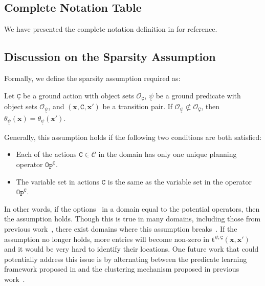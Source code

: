 

\subsection{Complete Notation Table}\label{app:notation}

We have presented the complete notation definition in  for reference.

\subsection{Discussion on the Sparsity Assumption}\label{app:assumption}
Formally, we define the sparsity assumption required as:
\begin{assumption}
    Let $\underline{\mathtt{C}}$ be a ground action with object sets $\mathcal{O}_{\underline{\mathtt{C}}}$, $\underline{\psi}$ be a 
    ground predicate with object sets $\mathcal{O}_{\underline{\psi}}$, and $(\mathbf{x}, \underline{\mathtt{C}}, \mathbf{x}')$ be a transition pair.
    If $\mathcal{O}_{\underline{\psi}} \not\subset\mathcal{O}_{\underline{\mathtt{C}}}$, then $\theta_{\underline{\psi}}(\mathbf{x})=\theta_{\underline{\psi}}(\mathbf{x}')$.
\end{assumption}
Generally, this assumption holds if the following two conditions are both satisfied:
\begin{itemize}
    \item Each of the actions $\mathtt{C}\in\mathcal{C}$ in the domain has only one unique planning operator $\mathtt{Op}^{\mathtt{C}}$.
    \item The variable set in actions $\mathtt{C}$ is the same as the variable set in the operator $\mathtt{Op}^{\mathtt{C}}$.
\end{itemize}
In other words, if the options~\cite{chitnis2021nsrt} in a domain equal to the potential operators, then the assumption holds.
Though this is true in many domains, including those from previous work~\cite{kumar2024practice}, there exist domains where this assumption breaks~\cite{silver2023predicateinvent,chitnis2021nsrt}.
If the assumption no longer holds, more entries will become non-zero in $\bm{t}^{\psi, \underline{\mathtt{C}}}(\mathbf{x}, \mathbf{x}')$ and it would be very hard to identify their locations.
One future work that could potentially address this issue is by alternating between the predicate learning framework proposed in  and the clustering mechanism proposed in previous work~\cite{chitnis2021nsrt}.

